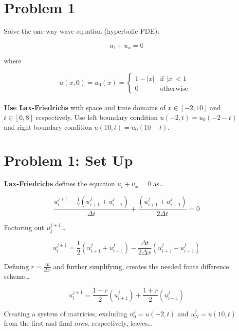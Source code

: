 \documentclass[12pt,letterpaper]{article}
\begin{document}
\section*{Problem 1}
Solve the one-way wave equation (hyperbolic PDE):

\begin{equation*}
u_t + u_x = 0
\end{equation*}

where


\begin{equation}
u(x,0)=u_0(x) =
\begin{cases}
1 -|x|& \text{if $|x| < 1$ }\\
0 & \text{otherwise}
\end{cases}
\end{equation}\\


\textbf{Use Lax-Friedrichs} with space and time domains of $x \in [-2,10]$ and $t \in [0,8]$ respectively. 
Use left boundary condition $u(-2,t)=u_0 (-2-t)$ and right boundary condition $u(10,t)=u_0 (10-t)$.
\\

\section*{Problem 1: Set Up}
\textbf{Lax-Friedrichs} defines the equation $u_{t} + u_{x} = 0$ as\ldots


\begin{equation*}
    \frac{u^{j+1}_{i} - \frac{1}{2}\left(u^{j}_{i+1} + u^{j}_{i-1}\right)}{\Delta t} + \frac{\left(u^{j}_{i+1} + u^{j}_{i-1}\right)}{2 \Delta t} = 0
\end{equation*}

Factoring out \textbf{$u^{j+1}_{j}$}\ldots

\begin{equation*}
    u^{j+1}_{i} = \frac{1}{2} \left(u^{j}_{i+1} + u^{j}_{i-1}\right) - \frac{\Delta t}{2 \Delta x} \left(u^{j}_{i+1} + u^{j}_{i-1}\right)
\end{equation*}

Defining $r=\frac{\Delta t}{\Delta x}$ and further simplifying, creates the needed finite difference scheme\ldots

\begin{equation*}
    u^{j+1}_{i} = \frac{1-r}{2} \left(u^{j}_{i+1}\right) + \frac{1+r}{2} \left(u^{j}_{i-1}\right)
\end{equation*}

Creating a system of matricies, excluding $u^{j}_{0} = u(-2,t)$ and $u^{j}_{N} = u(10,t)$ from the first and final rows, respectively, leaves\ldots
\end{document}
